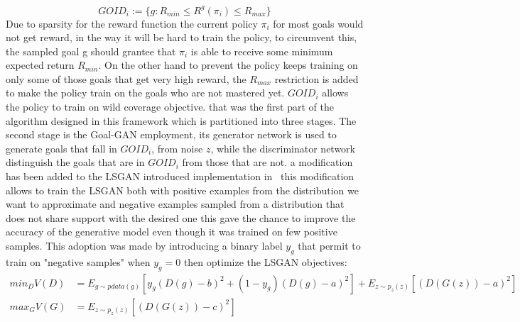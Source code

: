 \begin{equation}
GOID_i := \{ g : R_{min} \leqslant R^g(\pi_i) \leqslant R_{max}\}
\end{equation}
Due to sparsity for the reward function the current policy $\pi_i$ for most goals would not get reward, in the way it will be hard to train the policy, to circumvent this, the sampled goal g should grantee that $\pi_i$ is able to receive some minimum expected return $R_{min}$. On the other hand to prevent the policy keeps training on only some of those goals that get very high reward, the $R_{max}$ restriction is added to make the policy train on the goals who are not mastered yet. $GOID_i$ allows the policy to train on wild coverage objective. that was the first part of the algorithm designed in this framework which is partitioned into three stages. The second stage is the Goal-GAN employment, its generator network is used to generate goals that fall in $GOID_i$, from noise $z$, while the discriminator network distinguish the goals that are in $GOID_i$ from those that are not. a modification has been added to the LSGAN introduced implementation in~\citealp{Mao_2017_ICCV} this modification allows to train
the LSGAN both with positive examples from the distribution we want to approximate and negative examples
sampled from a distribution that does not share support with the desired one this gave the chance to improve the accuracy of the generative model even though it was trained on few positive samples. This adoption was made by introducing a binary label $y_g$ that permit to train on "negative samples" when $y_g = 0$ then optimize the LSGAN objectives:
\begin{align}
\nonumber min_D V(D) &= E_{g \sim pdata(g)}[y_g(D(g)-b)^2 + (1 -y_g)(D(g)- a)^2] + E_{z∼p_z(z)}[(D(G(z))- a)^2]\\ 
max_G V(G) &= E_{z∼p_z(z)}[(D(G(z))- c)^2]
\label{eq:LSGAN_loss}
\end{align}

